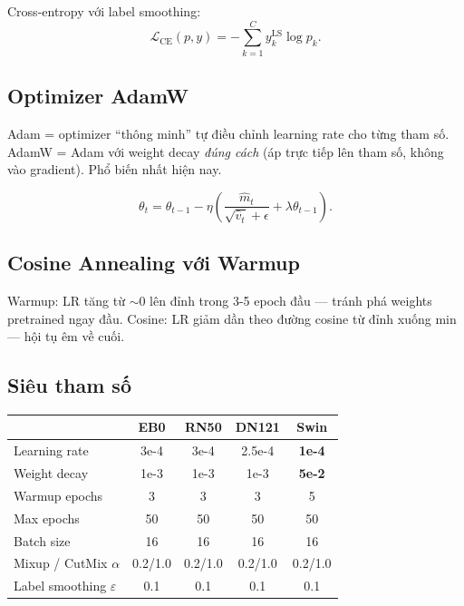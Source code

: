 \documentclass[11pt,a4paper]{article}
\begin{document}
Cross-entropy với label smoothing:
\[
  \mathcal{L}_{\text{CE}}(p, y) = -\sum_{k=1}^C y^{\text{LS}}_k \log p_k.
\]

\subsection{Optimizer AdamW}

\begin{simple}
Adam = optimizer ``thông minh'' tự điều chỉnh learning rate cho từng tham số. AdamW = Adam với weight decay \textit{đúng cách} (áp trực tiếp lên tham số, không vào gradient). Phổ biến nhất hiện nay.
\end{simple}

\[
  \theta_t = \theta_{t-1} - \eta \left( \frac{\hat{m}_t}{\sqrt{\hat{v}_t} + \epsilon} + \lambda \theta_{t-1} \right).
\]

\subsection{Cosine Annealing với Warmup}

\begin{simple}
Warmup: LR tăng từ $\sim 0$ lên đỉnh trong 3-5 epoch đầu --- tránh phá weights pretrained ngay đầu.
Cosine: LR giảm dần theo đường cosine từ đỉnh xuống min --- hội tụ êm về cuối.
\end{simple}

\subsection{Siêu tham số}

\begin{table}[h]
\centering\small
\begin{tabular}{lcccc}
\toprule
& \textbf{EB0} & \textbf{RN50} & \textbf{DN121} & \textbf{Swin} \\
\midrule
Learning rate       & 3e-4 & 3e-4 & 2.5e-4 & \textbf{1e-4} \\
Weight decay        & 1e-3 & 1e-3 & 1e-3   & \textbf{5e-2} \\
Warmup epochs       & 3    & 3    & 3      & 5 \\
Max epochs          & 50   & 50   & 50     & 50 \\
Batch size          & 16   & 16   & 16     & 16 \\
Mixup / CutMix $\alpha$ & 0.2/1.0 & 0.2/1.0 & 0.2/1.0 & 0.2/1.0 \\
Label smoothing $\varepsilon$ & 0.1 & 0.1 & 0.1 & 0.1 \\
\bottomrule
\end{tabular}
\end{table}
\end{document}
